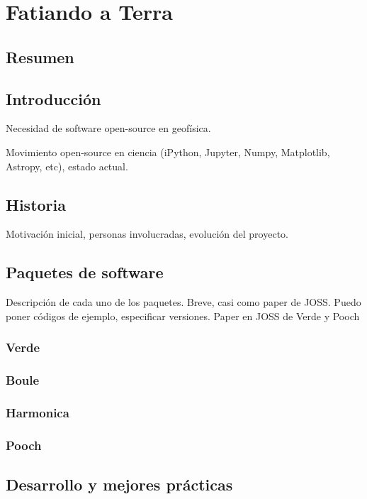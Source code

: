 \chapter{Fatiando a Terra}

\section{Resumen}


\section{Introducción}

Necesidad de software open-source en geofísica.

Movimiento open-source en ciencia (iPython, Jupyter, Numpy, Matplotlib,
Astropy, etc), estado actual.


\section{Historia}

Motivación inicial, personas involucradas, evolución del proyecto.


\section{Paquetes de software}

Descripción de cada uno de los paquetes. Breve, casi como paper de JOSS.
Puedo poner códigos de ejemplo, especificar versiones.
Paper en JOSS de Verde y Pooch

\subsection{Verde}

\subsection{Boule}

\subsection{Harmonica}

\subsection{Pooch}


\section{Desarrollo y mejores prácticas}

